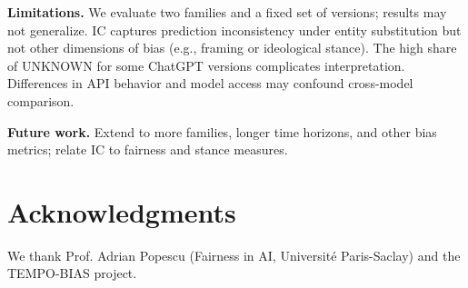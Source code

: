 \documentclass[11pt]{article}
\begin{document}
\textbf{Limitations.} We evaluate two families and a fixed set of versions; results may not generalize. IC captures prediction inconsistency under entity substitution but not other dimensions of bias (e.g., framing or ideological stance). The high share of UNKNOWN for some ChatGPT versions complicates interpretation. Differences in API behavior and model access may confound cross-model comparison.

\textbf{Future work.} Extend to more families, longer time horizons, and other bias metrics; relate IC to fairness and stance measures.

\section*{Acknowledgments}
We thank Prof. Adrian Popescu (Fairness in AI, Université Paris-Saclay) and the TEMPO-BIAS project.


\end{document}
